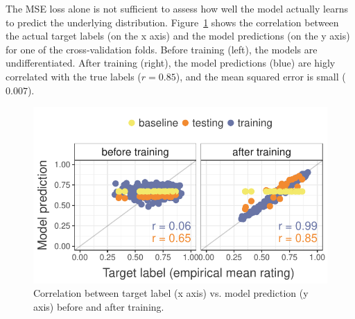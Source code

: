 \documentclass[11pt,a4paper]{article}
\begin{document}

The MSE loss alone is not sufficient to assess how well the model actually learns to predict the underlying distribution. Figure~\ref{fig:corr-cv0} shows the correlation between the actual target labels (on the x axis) and the model predictions (on the y axis) for one of the cross-validation folds. Before training (left), the models are undifferentiated. After training (right), the model predictions (blue) are higly correlated with the true labels ($r=0.85$), and the mean squared error is small ($0.007$).


\begin{figure}
  \includegraphics[width=\linewidth]{graphs/cv0-pred-target-epoch0-29.pdf}
  \caption{Correlation between target label (x axis) vs. model prediction (y axis) before and after training.}
  \label{fig:corr-cv0}
\end{figure}
\end{document}
